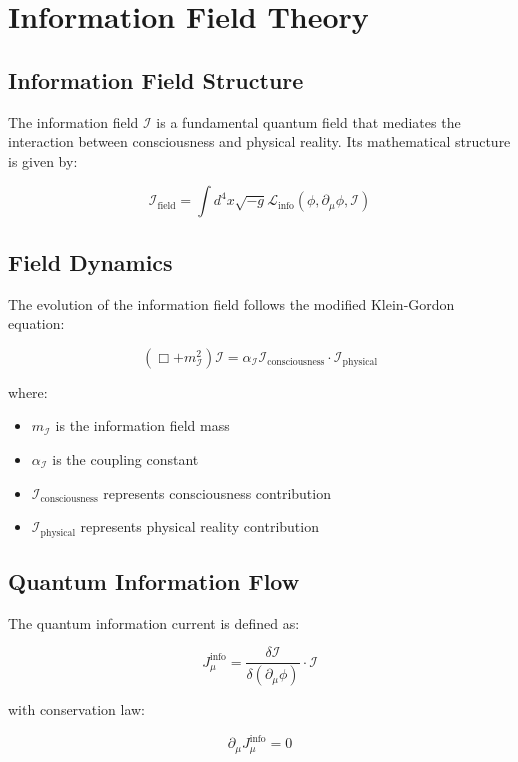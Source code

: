 \section{Information Field Theory}

\subsection{Information Field Structure}

The information field \(\mathcal{I}\) is a fundamental quantum field that mediates the interaction between consciousness and physical reality. Its mathematical structure is given by:

\[
\mathcal{I}_{\text{field}} = \int d^4x \sqrt{-g} \mathcal{L}_{\text{info}}(\phi, \partial_{\mu}\phi, \mathcal{I})
\]

\subsection{Field Dynamics}

The evolution of the information field follows the modified Klein-Gordon equation:

\[
(\Box + m_{\mathcal{I}}^2)\mathcal{I} = \alpha_{\mathcal{I}} \mathcal{I}_{\text{consciousness}} \cdot \mathcal{I}_{\text{physical}}
\]

where:
\begin{itemize}
    \item \(m_{\mathcal{I}}\) is the information field mass
    \item \(\alpha_{\mathcal{I}}\) is the coupling constant
    \item \(\mathcal{I}_{\text{consciousness}}\) represents consciousness contribution
    \item \(\mathcal{I}_{\text{physical}}\) represents physical reality contribution
\end{itemize}

\subsection{Quantum Information Flow}

The quantum information current is defined as:

\[
J_{\mu}^{\text{info}} = \frac{\delta \mathcal{I}}{\delta (\partial_{\mu}\phi)} \cdot \mathcal{I}
\]

with conservation law:

\[
\partial_{\mu}J_{\mu}^{\text{info}} = 0
\]

